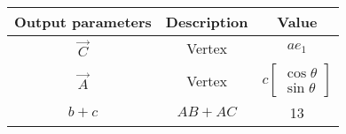   \begin{tabular}{|c|c|c|}
    \hline
    \textbf{Output parameters}&\textbf{Description}&\textbf{Value}\\
    \hline
    $\Vec{C}$&Vertex&$ae_1$\\
    \hline
    $\Vec{A}$&Vertex&$c\begin{bmatrix}
        \cos{\theta}\\\sin{\theta}
    \end{bmatrix}$\\
    \hline
    $b+c$&$AB + AC$&13\\
    \hline
    \end{tabular}
